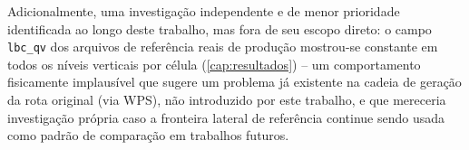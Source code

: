 Adicionalmente, uma investigação independente e de menor prioridade
identificada ao longo deste trabalho, mas fora de seu escopo direto: o
campo \texttt{lbc\_qv} dos arquivos de referência reais de produção
mostrou-se constante em todos os níveis verticais por célula
(\cref{cap:resultados}) -- um comportamento fisicamente implausível que
sugere um problema já existente na cadeia de geração da rota original
(via WPS), não introduzido por este trabalho, e que mereceria
investigação própria caso a fronteira lateral de referência continue
sendo usada como padrão de comparação em trabalhos futuros.
